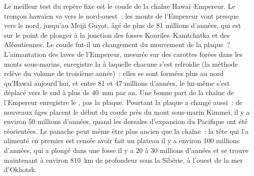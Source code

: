 Le meilleur test du repère fixe est le coude de la chaîne Hawaï--Empereur.
Le tronçon hawaïen va vers le nord-ouest~; les monts de l'Empereur vont presque
vers le nord, jusqu'au Meiji Guyot, âgé de plus de 81 millions d'années, qui est sur le point de
plonger à la jonction des fosses Kouriles--Kamtchatka et des Aléoutiennes. Le
coude fut-il un changement du mouvement de la plaque~? L'aimantation des laves
de l'Empereur, mesurée sur des carottes forées dans les monts sous-marins, enregistre la  à laquelle
chacune s'est refroidie (la méthode relève du volume de troisième année)~: elles se sont formées
plus au nord qu'Hawaï aujourd'hui, et entre 81 et 47 millions d'années, le
 lui-même s'est déplacé vers le sud à plus de \qty{40}{mm} par an.
Une bonne part de la chaîne de l'Empereur enregistre le , pas la plaque. Pourtant la plaque a changé aussi~:
de nouveaux âges placent le début du coude près du mont sous-marin Kimmei, il y a environ 50 millions
d'années, quand les dorsales d'expansion du Pacifique ont été réorientées. Le panache
peut même être plus ancien que la chaîne~: la tête qui l'a alimenté en premier est censée
avoir fait un plateau il y a environ 100 millions d'années, qui a plongé dans une fosse il y a 20
à 30 millions d'années et se trouve maintenant à environ \qty{810}{km} de profondeur sous
la Sibérie, à l'ouest de la mer d'Okhotsk.

